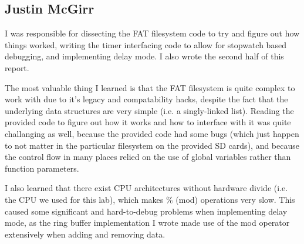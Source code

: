 \documentclass[12pt]{article}
\begin{document}
\subsection{Justin McGirr}
I was responsible for dissecting the FAT filesystem code to try and figure out
how things worked, writing the timer interfacing code to allow for stopwatch
based debugging, and implementing delay mode. I also wrote the second half of
this report.

The most valuable thing I learned is that the FAT filesystem is quite complex
to work with due to it's legacy and compatability hacks, despite the fact that
the underlying data structures are very simple (i.e. a singly-linked list).
Reading the provided code to figure out how it works and how to interface with
it was quite challanging as well, because the provided code had some bugs
(which just happen to not matter in the particular filesystem on the provided
SD cards), and because the control flow in many places relied on the use of
global variables rather than function parameters.

I also learned that there exist CPU architectures without hardware divide
(i.e. the CPU we used for this lab), which makes \% (mod) operations very
slow. This caused some significant and hard-to-debug problems when implementing
delay mode, as the ring buffer implementation I wrote made use of the mod
operator extensively when adding and removing data.
\end{document}
